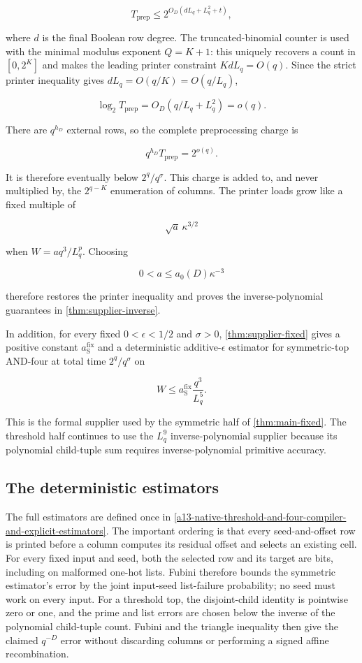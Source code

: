 \documentclass[11pt,letterpaper]{article}
\newcommand{\cref}[1]{\ref{#1}}
\theoremstyle{definition}
\theoremstyle{remark}
\begin{document}
\[
T_{\mathrm{prep}}
\le
2^{O_D(dL_q+L_q^2+t)},
\]

where \(d\) is the final Boolean row degree. The truncated-binomial
counter is used with the minimal modulus exponent \(Q=K+1\): this
uniquely recovers a count in \([0,2^K]\) and makes the leading printer
constraint \(K d L_q=O(q)\). Since the strict printer inequality gives
\(dL_q=O(q/K)=O(q/L_q)\),

\[
\log_2T_{\mathrm{prep}}
{}={}
O_D(q/L_q+L_q^2)
=o(q).
\]

There are \(q^{h_D}\) external rows, so the complete preprocessing
charge is

\[
q^{h_D}T_{\mathrm{prep}}
{}={}
2^{o(q)}.
\]

It is therefore eventually below \(2^q/q^\sigma\). This charge is added
to, and never multiplied by, the \(2^{q-K}\) enumeration of columns. The
printer loads grow like a fixed multiple of

\[
\sqrt a\,\kappa^{3/2}
\]

when \(W=a q^3/L_q^p\). Choosing

\[
0<a\le a_0(D)\kappa^{-3}
\]

therefore restores the printer inequality and proves the
inverse-polynomial guarantees in \cref{thm:supplier-inverse}.

In addition, for every fixed \(0<\epsilon<1/2\) and \(\sigma>0\),
\cref{thm:supplier-fixed} gives a positive constant \(a_{\mathrm S}^{\mathrm{fix}}\)
and a deterministic additive-\(\epsilon\) estimator for symmetric-top
AND-four at total time \(2^q/q^\sigma\) on

\[
W\le a_{\mathrm S}^{\mathrm{fix}}\frac{q^3}{L_q^5}.
\]

This is the formal supplier used by the symmetric half of \cref{thm:main-fixed}.
The threshold half continues to use the \(L_q^9\) inverse-polynomial
supplier because its polynomial child-tuple sum requires
inverse-polynomial primitive accuracy.

\subsection{The deterministic
estimators}\label{44-the-deterministic-estimators}

The full estimators are defined once in
\cref{a13-native-threshold-and-four-compiler-and-explicit-estimators}. The
important ordering is that every seed-and-offset row is printed before a
column computes its residual offset and selects an existing cell. For every
fixed input and seed, both the selected row and its target are bits, including
on malformed one-hot lists. Fubini therefore bounds the symmetric estimator's
error by the joint input-seed list-failure probability; no seed must work on
every input. For a threshold top, the disjoint-child identity is pointwise
zero or one, and the prime and list errors are chosen below the inverse of the
polynomial child-tuple count. Fubini and the triangle inequality then give
the claimed \(q^{-D}\) error without discarding columns or performing a
signed affine recombination.
\end{document}
